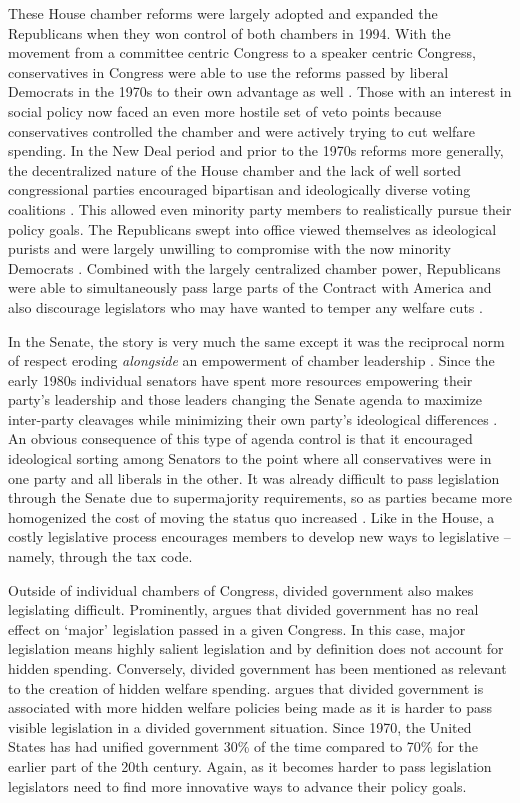\documentclass[12pt]{article}
\begin{document}
These House chamber reforms were largely adopted and expanded the Republicans when they won control of both chambers in 1994. With the movement from a committee centric Congress to a speaker centric Congress, conservatives in Congress were able to use the reforms passed by liberal Democrats in the 1970s to their own advantage as well \citep{zelizer2007}. Those with an interest in social policy now faced an even more hostile set of veto points because conservatives controlled the chamber and were actively trying to cut welfare spending. In the New Deal period and prior to the 1970s reforms more generally, the decentralized nature of the House chamber and the lack of well sorted congressional parties encouraged bipartisan and ideologically diverse voting coalitions \citep{poole1997}. This allowed even minority party members to realistically pursue their policy goals. The Republicans swept into office viewed themselves as ideological purists and were largely unwilling to compromise with the now minority Democrats \citep{hacker2006}. Combined with the largely centralized chamber power, Republicans were able to simultaneously pass large parts of the Contract with America and also discourage legislators who may have wanted to temper any welfare cuts \citep{aldrich2000}. 

In the Senate, the story is very much the same except it was the reciprocal norm of respect eroding \emph{alongside} an empowerment of chamber leadership \citep{sinclair1986}. Since the early 1980s individual senators have spent more resources empowering their party's leadership and those leaders changing the Senate agenda to maximize inter-party cleavages while minimizing their own party's ideological differences \citep{lee2008}. An obvious consequence of this type of agenda control is that it encouraged ideological sorting among Senators to the point where all conservatives were in one party and all liberals in the other. It was already difficult to pass legislation through the Senate due to supermajority requirements, so as parties became more homogenized the cost of moving the status quo increased \citep{koger2010}. Like in the House, a costly legislative process encourages members to develop new ways to legislative -- namely, through the tax code.

Outside of individual chambers of Congress, divided government also makes legislating difficult. Prominently, \cite{mayhew1990} argues that divided government has no real effect on `major' legislation passed in a given Congress. In this case, major legislation means highly salient legislation and by definition does not account for hidden spending. Conversely, divided government has been mentioned as relevant to the creation of hidden welfare spending. \citet[Ch. 4]{howard2008} argues that divided government is associated with more hidden welfare policies being made as it is harder to pass visible legislation in a divided government situation. Since 1970, the United States has had unified government 30\% of the time compared to 70\% for the earlier part of the 20th century. Again, as it becomes harder to pass legislation legislators need to find more innovative ways to advance their policy goals.
\end{document}
